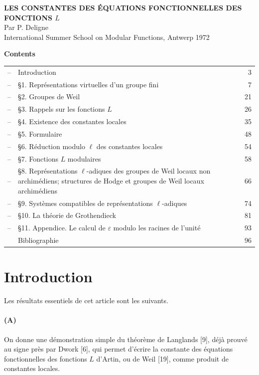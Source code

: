\documentclass[10pt]{article}
\begin{document}
\begin{center}
{\Large\bfseries LES CONSTANTES DES ÉQUATIONS FONCTIONNELLES DES FONCTIONS \(L\)}\\[2em]
{\large Par P. Deligne}\\[6em]
International Summer School on Modular Functions, Antwerp 1972
\end{center}

\newpage

\begin{center}
\bfseries Contents
\end{center}

\noindent\begin{tabularx}{\textwidth}{@{}p{}Xr@{}}
--& Introduction & 3\\
--& \S1. Représentations virtuelles d'un groupe fini & 7\\
--& \S2. Groupes de Weil & 21\\
--& \S3. Rappels sur les fonctions \(L\) & 26\\
--& \S4. Existence des constantes locales & 35\\
--& \S5. Formulaire & 48\\
--& \S6. Réduction modulo \(\ell\) des constantes locales & 54\\
--& \S7. Fonctions \(L\) modulaires & 58\\
--& \S8. Représentations \(\ell\)-adiques des groupes de Weil locaux non archimédiens; structures de Hodge et groupes de Weil locaux archimédiens & 66\\
--& \S9. Systèmes compatibles de représentations \(\ell\)-adiques & 74\\
--& \S10. La théorie de Grothendieck & 81\\
--& \S11. Appendice. Le calcul de \(\varepsilon\) modulo les racines de l'unité & 93\\
& Bibliographie & 96
\end{tabularx}

\newpage

\section*{Introduction}

Les résultats essentiels de cet article sont les suivants.

\paragraph{(A)} On donne une démonstration simple du théorème de Langlands [9], déjà prouvé au signe près par Dwork [6], qui permet d'écrire la constante des équations fonctionnelles des fonctions \(L\) d'Artin, ou de Weil [19], comme produit de constantes locales.
\end{document}
